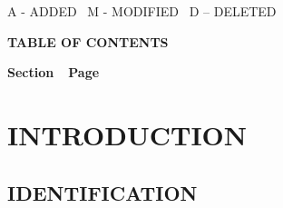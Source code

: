 \documentclass[twoside,letterpaper]{article}
\begin{document}
{\color{black}
A - ADDED \ M - MODIFIED \ D -- DELETED}


{\centering{}\bfseries\color{black}
TABLE OF CONTENTS
\par}

{\bfseries\color{black}
Section\ \ Page}

\setcounter{tocdepth}{3}
\renewcommand\contentsname{}
\tableofcontents

\bigskip

\bigskip



\clearpage\setcounter{page}{1}\pagestyle{Convertiv}
\section[INTRODUCTION]{\bfseries\color{black}
INTRODUCTION}

\subsection{IDENTIFICATION}
\end{document}
